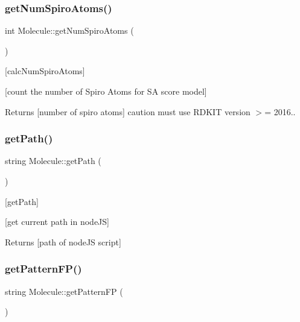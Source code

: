 \subsubsection{\texorpdfstring{get\+Num\+Spiro\+Atoms()}{getNumSpiroAtoms()}}
{\footnotesize\ttfamily int Molecule\+::get\+Num\+Spiro\+Atoms (\begin{DoxyParamCaption}{ }\end{DoxyParamCaption})}



\mbox{[}calc\+Num\+Spiro\+Atoms\mbox{]} 

\mbox{[}count the number of Spiro Atoms for SA score model\mbox{]} \begin{DoxyReturn}{Returns}
\mbox{[}number of spiro atoms\mbox{]} caution must use R\+D\+K\+IT version $>$= 2016.. 
\end{DoxyReturn}
\mbox{\label{class_molecule_a5d97408c9357663ceb2b2bff4471c602}} 
\subsubsection{\texorpdfstring{get\+Path()}{getPath()}}
{\footnotesize\ttfamily string Molecule\+::get\+Path (\begin{DoxyParamCaption}{ }\end{DoxyParamCaption})}



\mbox{[}get\+Path\mbox{]} 

\mbox{[}get current path in node\+JS\mbox{]} \begin{DoxyReturn}{Returns}
\mbox{[}path of node\+JS script\mbox{]} 
\end{DoxyReturn}
\mbox{\label{class_molecule_a7f662f6ba9e4d12024ff242042df65be}} 
\subsubsection{\texorpdfstring{get\+Pattern\+F\+P()}{getPatternFP()}}
{\footnotesize\ttfamily string Molecule\+::get\+Pattern\+FP (\begin{DoxyParamCaption}{ }\end{DoxyParamCaption})}



